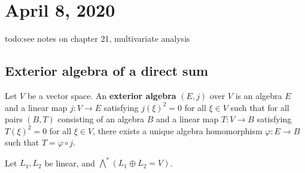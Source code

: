\section{April 8, 2020} 
{\color{red}todo:see notes on chapter 21, multivariate analysis} 
\subsection{Exterior algebra of a direct sum}
\begin{definition}[]
    Let $V$ be a vector space. An \textbf{exterior algebra} $(E,j)$ over $V$ is an algebra $E$ and a linear map $j \colon V \to E$ satisfying $j(\xi)^2=0$ for all $\xi \in V$ such that for all pairs $(B,T)$ consisting of an algebra $B$ and a linear map $T \colon V \to B$ satisfying $T(\xi)^2=0$ for all $\xi \in V$, there exists a unique algebra homomorphism $\varphi  \colon E \to B$ such that $T= \varphi \circ j$.
\end{definition}

Let $L_1,L_2$ be linear, and $\bigwedge ^*(L_1\oplus L_2=V)$. 
